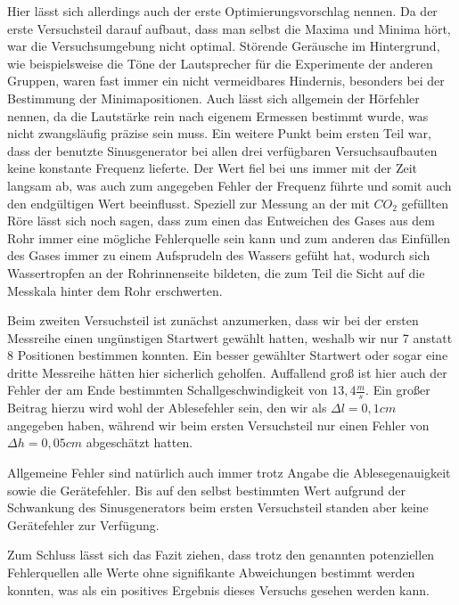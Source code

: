 \documentclass{article}
\begin{document}
Hier lässt sich allerdings auch der erste Optimierungsvorschlag nennen. Da der erste Versuchsteil darauf aufbaut, dass man selbst die Maxima und Minima hört, war die Versuchsumgebung nicht optimal. Störende Geräusche im Hintergrund, wie beispielsweise die Töne der Lautsprecher für die Experimente der anderen Gruppen, waren fast immer ein nicht vermeidbares Hindernis, besonders bei der Bestimmung der Minimapositionen. Auch lässt sich allgemein der Hörfehler nennen, da die Lautstärke rein nach eigenem Ermessen bestimmt wurde, was nicht zwangsläufig präzise sein muss. Ein weitere Punkt beim ersten Teil war, dass der benutzte Sinusgenerator bei allen drei verfügbaren Versuchsaufbauten keine konstante Frequenz lieferte. Der Wert fiel bei uns immer mit der Zeit langsam ab, was auch zum angegeben Fehler der Frequenz führte und somit auch den endgültigen Wert beeinflusst. Speziell zur Messung an der mit $CO_2$ gefüllten Röre lässt sich noch sagen, dass zum einen das Entweichen des Gases aus dem Rohr immer eine mögliche Fehlerquelle sein kann und zum anderen das Einfüllen des Gases immer zu einem Aufsprudeln des Wassers gefüht hat, wodurch sich Wassertropfen an der Rohrinnenseite bildeten, die zum Teil die Sicht auf die Messkala hinter dem Rohr erschwerten. 

Beim zweiten Versuchsteil ist zunächst anzumerken, dass wir bei der ersten Messreihe einen ungünstigen Startwert gewählt hatten, weshalb wir nur 7 anstatt 8 Positionen bestimmen konnten. Ein besser gewählter Startwert oder sogar eine dritte Messreihe hätten hier sicherlich geholfen. Auffallend groß ist hier auch der Fehler der am Ende bestimmten Schallgeschwindigkeit von $13,4 \frac{m}{s}$. Ein großer Beitrag hierzu wird wohl der Ablesefehler sein, den wir als $\Delta l = 0,1cm$ angegeben haben, während wir beim ersten Versuchsteil nur einen Fehler von $\Delta h = 0,05cm$ abgeschätzt hatten.

Allgemeine Fehler sind natürlich auch immer trotz Angabe die Ablesegenauigkeit sowie die Gerätefehler. Bis auf den selbst bestimmten Wert aufgrund der Schwankung des Sinusgenerators beim ersten Versuchsteil standen aber keine Gerätefehler zur Verfügung. 

Zum Schluss lässt sich das Fazit ziehen, dass trotz den genannten potenziellen Fehlerquellen alle Werte ohne signifikante Abweichungen bestimmt werden konnten, was als ein positives Ergebnis dieses Versuchs gesehen werden kann. 
\end{document}
